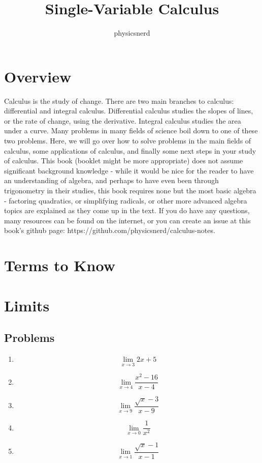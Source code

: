 \documentclass[12pt]{article}
\title{Single-Variable Calculus}
\author{physicsnerd}
\begin{document}
\maketitle
\tableofcontents

\section{Overview}
Calculus is the study of change. 
There are two main branches to calculus: differential and integral calculus. 
Differential calculus studies the slopes of lines, or the rate of change, using the derivative. 
Integral calculus studies the area under a curve. 
Many problems in many fields of science boil down to one of these two problems. 
Here, we will go over how to solve problems in the main fields of calculus, some applications of calculus, and finally some next steps in your study of calculus.
This book (booklet might be more appropriate) does not assume significant background knowledge - while it would be nice for the reader to have an understanding of algebra, and perhaps to have even been through trigonometry in their studies, this book requires none but the most basic algebra - factoring quadratics, or simplifying radicals, or other more advanced algebra topics are explained as they come up in the text. 
If you do have any questions, many resources can be found on the internet, or you can create an issue at this book's github page: https://github.com/physicsnerd/calculus-notes.

\section{Terms to Know}



\section{Limits}



\subsection{Problems}
\begin{enumerate}
    \item $$\lim\limits_{x\rightarrow 3} 2x+5$$
    \item $$\lim\limits_{x\rightarrow 4} \frac{x^2-16}{x-4}$$
    \item $$\lim\limits_{x\rightarrow 9} \frac{\sqrt{x}-3}{x-9}$$
    \item $$\lim\limits_{x\rightarrow 0} \frac{1}{x^2}$$
    \item $$\lim\limits_{x\rightarrow 1} \frac{\sqrt{x}-1}{x-1}$$
\end{enumerate}
\end{document}
